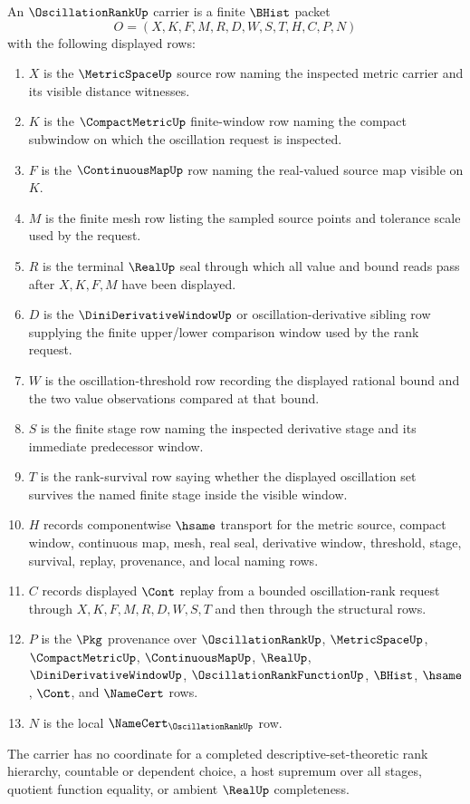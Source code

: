\begin{definition}
\label{def:oscillation-rank-carrier}
An $\OscillationRankUp$ carrier is a finite $\BHist$ packet
$$
O=(X,K,F,M,R,D,W,S,T,H,C,P,N)
$$
with the following displayed rows:
\begin{enumerate}
\item $X$ is the $\MetricSpaceUp$ source row naming the inspected metric carrier and its visible distance witnesses.
\item $K$ is the $\CompactMetricUp$ finite-window row naming the compact subwindow on which the oscillation request is inspected.
\item $F$ is the $\ContinuousMapUp$ row naming the real-valued source map visible on $K$.
\item $M$ is the finite mesh row listing the sampled source points and tolerance scale used by the request.
\item $R$ is the terminal $\RealUp$ seal through which all value and bound reads pass after $X,K,F,M$ have been displayed.
\item $D$ is the $\DiniDerivativeWindowUp$ or oscillation-derivative sibling row supplying the finite upper/lower comparison window used by the rank request.
\item $W$ is the oscillation-threshold row recording the displayed rational bound and the two value observations compared at that bound.
\item $S$ is the finite stage row naming the inspected derivative stage and its immediate predecessor window.
\item $T$ is the rank-survival row saying whether the displayed oscillation set survives the named finite stage inside the visible window.
\item $H$ records componentwise $\hsame$ transport for the metric source, compact window, continuous map, mesh, real seal, derivative window, threshold, stage, survival, replay, provenance, and local naming rows.
\item $C$ records displayed $\Cont$ replay from a bounded oscillation-rank request through $X,K,F,M,R,D,W,S,T$ and then through the structural rows.
\item $P$ is the $\Pkg$ provenance over $\OscillationRankUp$, $\MetricSpaceUp$, $\CompactMetricUp$, $\ContinuousMapUp$, $\RealUp$, $\DiniDerivativeWindowUp$, $\OscillationRankFunctionUp$, $\BHist$, $\hsame$, $\Cont$, and $\NameCert$ rows.
\item $N$ is the local $\NameCert_{\OscillationRankUp}$ row.
\end{enumerate}
The carrier has no coordinate for a completed descriptive-set-theoretic rank hierarchy, countable or dependent choice, a host supremum over all stages, quotient function equality, or ambient $\RealUp$ completeness.
\end{definition}

